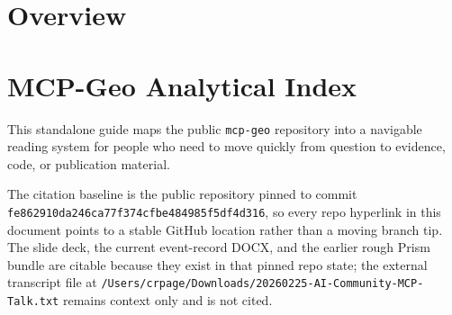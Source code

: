 \section{Overview}\label{overview}

\section{MCP-Geo Analytical Index}\label{mcp-geo-analytical-index}

This standalone guide maps the public \texttt{mcp-geo} repository into a
navigable reading system for people who need to move quickly from
question to evidence, code, or publication material.

The citation baseline is the public repository pinned to commit
\texttt{fe862910da246ca77f374cfbe484985f5df4d316}, so every repo
hyperlink in this document points to a stable GitHub location rather
than a moving branch tip. The slide deck, the current event-record DOCX,
and the earlier rough Prism bundle are citable because they exist in
that pinned repo state; the external transcript file at
\texttt{/Users/crpage/Downloads/20260225-AI-Community-MCP-Talk.txt}
remains context only and is not cited.
